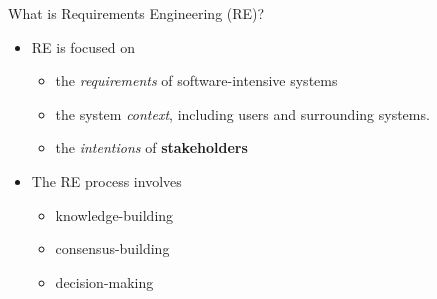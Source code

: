 
\begin{Slide}{What is Requirements Engineering (RE)?}

\begin{itemize}
\item RE is focused on 

\begin{itemize}
\item the \textit{requirements} of software-intensive systems 
\item the system \textit{context}, including users and surrounding systems.
\item the \textit{intentions} of \textbf{stakeholders}

\end{itemize}
\item The RE process involves 
\begin{itemize}
\item knowledge-building
\item consensus-building
\item decision-making
\end{itemize}
\end{itemize}
\end{Slide}
